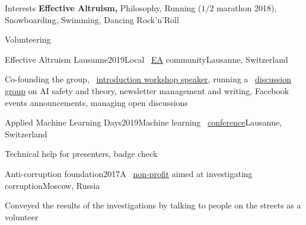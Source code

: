 \documentclass{resume} %
\newcommand{\mylink}{{\color{gray}\faExternalLink}}
\begin{document}
\begin{rSection}{Interests}
	{\bf Effective Altruism,} Philosophy, Running ($1/2$ marathon 2018), Snowboarding, Swimming, Dancing Rock'n'Roll
\end{rSection}

\begin{rSection}{Volunteering}
\begin{rSubsection}{Effective Altruism Lausanne}{2019}{Local \mylink~\href{https://effectivealtruism.org}{EA} community}{Lausanne, Switzerland}
	\item[] Co-founding the group, \mylink~\href{http://eageneva.org/about#our-members}{introduction workshop speaker}, running a \mylink~\href{https://docs.google.com/document/d/1prejPACr08nUVztHRBc4nj4upKtDc9_EJOYi1alWuYM/edit?usp=sharing}{discussion group} on AI safety and theory, newsletter management and writing, Facebook events announcements, managing open discussions
\end{rSubsection}
\begin{rSubsection}{Applied Machine Learning Days}{2019}{Machine learning \mylink~\href{https://www.appliedmldays.org/}{conference}}{Lausanne, Switzerland}
\item[]	Technical help for presenters, badge check
\end{rSubsection}
	\begin{rSubsection}{Anti-corruption foundation}{2017}{A \mylink~\href{https://en.wikipedia.org/wiki/Anti-Corruption_Foundation}{non-profit} aimed at investigating corruption}{Moscow, Russia}
\item[] Conveyed the results of the investigations by talking to people on the streets as a volunteer
	\end{rSubsection}
\end{rSection}

\end{document}
